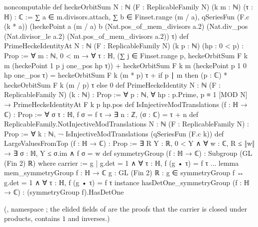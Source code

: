 \begin{leancode}
noncomputable def heckeOrbitSum {N : ℕ} (F : ReplicableFamily N) (k m : ℕ) (τ : ℍ) : ℂ :=
  ∑ a ∈ m.divisors.attach, ∑ b ∈ Finset.range (m / a),
    qSeriesFun (F.c (k * a)) (heckePoint a (m / a) b (Nat.pos_of_mem_divisors a.2)
      (Nat.div_pos (Nat.divisor_le a.2) (Nat.pos_of_mem_divisors a.2)) τ)
def PrimeHeckeIdentityAt {N : ℕ} (F : ReplicableFamily N) (k p : ℕ) (hp : 0 < p) : Prop :=
  ∀ m : ℕ, 0 < m → ∀ τ : ℍ,
    (∑ j ∈ Finset.range p, heckeOrbitSum F k m (heckePoint 1 p j one_pos hp τ)) +
        heckeOrbitSum F k m (heckePoint p 1 0 hp one_pos τ) =
      heckeOrbitSum F k (m * p) τ +
        if p ∣ m then (p : ℂ) * heckeOrbitSum F k (m / p) τ else 0
def PrimeHeckeIdentity {N : ℕ} (F : ReplicableFamily N) (k : ℕ) : Prop :=
  ∀ p : ℕ, ∀ hp : p.Prime, p ≡ 1 [MOD N] → PrimeHeckeIdentityAt F k p hp.pos
def IsInjectiveModTranslations (f : ℍ → ℂ) : Prop :=
  ∀ σ τ : ℍ, f σ = f τ → ∃ n : ℤ, (σ : ℂ) = τ + n
def ReplicableFamily.NotInjectiveModTranslations {N : ℕ} (F : ReplicableFamily N) : Prop :=
  ∀ k : ℕ, ¬ IsInjectiveModTranslations (qSeriesFun (F.c k))
def LargeValuesFromTop (f : ℍ → ℂ) : Prop :=
  ∃ R Y : ℝ, 0 < Y ∧ ∀ w : ℂ, R ≤ ‖w‖ → ∃ σ : ℍ, Y ≤ σ.im ∧ f σ = w
def symmetryGroup (f : ℍ → ℂ) : Subgroup (GL (Fin 2) ℝ) where
  carrier := {g | g.det = 1 ∧ ∀ τ : ℍ, f (g • τ) = f τ}
  ...
lemma mem_symmetryGroup {f : ℍ → ℂ} {g : GL (Fin 2) ℝ} :
    g ∈ symmetryGroup f ↔ g.det = 1 ∧ ∀ τ : ℍ, f (g • τ) = f τ
instance hasDetOne_symmetryGroup (f : ℍ → ℂ) : (symmetryGroup f).HasDetOne
\end{leancode}
(, namespace ; the elided fields of
 are the proofs that the carrier is closed under products, contains $1$ and inverses.)
